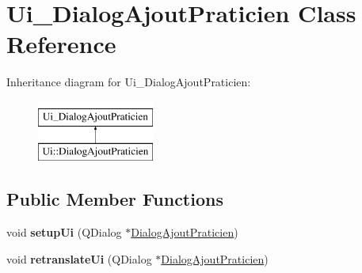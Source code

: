 \hypertarget{classUi__DialogAjoutPraticien}{\section{Ui\-\_\-\-Dialog\-Ajout\-Praticien Class Reference}
\label{classUi__DialogAjoutPraticien}
}
Inheritance diagram for Ui\-\_\-\-Dialog\-Ajout\-Praticien\-:\begin{figure}[H]
\begin{center}
\leavevmode
\includegraphics[height=2.000000cm]{classUi__DialogAjoutPraticien}
\end{center}
\end{figure}
\subsection*{Public Member Functions}
\begin{DoxyCompactItemize}
\item 
\hypertarget{classUi__DialogAjoutPraticien_a680faa38056bf525d0f469682c592241}{void {\bfseries setup\-Ui} (Q\-Dialog $\ast$\hyperlink{classDialogAjoutPraticien}{Dialog\-Ajout\-Praticien})}\label{classUi__DialogAjoutPraticien_a680faa38056bf525d0f469682c592241}

\item 
\hypertarget{classUi__DialogAjoutPraticien_abf6034d3dfe3d33117d3dc02d9fb1b94}{void {\bfseries retranslate\-Ui} (Q\-Dialog $\ast$\hyperlink{classDialogAjoutPraticien}{Dialog\-Ajout\-Praticien})}\label{classUi__DialogAjoutPraticien_abf6034d3dfe3d33117d3dc02d9fb1b94}

\end{DoxyCompactItemize}
